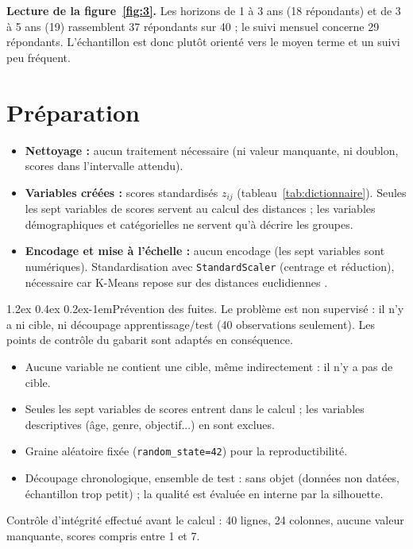 \documentclass[11pt,a4paper]{article}
\makeatletter
\renewcommand\paragraph{\@startsection{paragraph}{4}{\z@}%
  {1.2ex \@plus 0.4ex \@minus 0.2ex}{-1em}{\normalfont\normalsize\bfseries}}
\makeatother
\begin{document}
\noindent\textbf{Lecture de la figure~\ref{fig:3}.} Les horizons de 1 à 3 ans (18 répondants) et de 3 à 5 ans (19) rassemblent 37 répondants sur 40 ; le suivi mensuel concerne 29 répondants. L'échantillon est donc plutôt orienté vers le moyen terme et un suivi peu fréquent.

\section{Préparation}
\label{sec:preparation}
\begin{itemize}
  \item \textbf{Nettoyage :} aucun traitement nécessaire (ni valeur manquante, ni doublon, scores dans l'intervalle attendu).
  \item \textbf{Variables créées :} scores standardisés $z_{ij}$ (tableau~\ref{tab:dictionnaire}). Seules les sept variables de scores servent au calcul des distances ; les variables démographiques et catégorielles ne servent qu'à décrire les groupes.
  \item \textbf{Encodage et mise à l'échelle :} aucun encodage (les sept variables sont numériques). Standardisation avec \texttt{StandardScaler} (centrage et réduction), nécessaire car K-Means repose sur des distances euclidiennes \cite{sklearn}.
\end{itemize}

\paragraph{Prévention des fuites.} Le problème est non supervisé : il n'y a ni cible, ni découpage apprentissage/test (40 observations seulement). Les points de contrôle du gabarit sont adaptés en conséquence.
\begin{itemize}
  \item[$\boxtimes$] Aucune variable ne contient une cible, même indirectement : il n'y a pas de cible.
  \item[$\boxtimes$] Seules les sept variables de scores entrent dans le calcul ; les variables descriptives (âge, genre, objectif...) en sont exclues.
  \item[$\boxtimes$] Graine aléatoire fixée (\texttt{random\_state=42}) pour la reproductibilité.
  \item[$\square$] Découpage chronologique, ensemble de test : sans objet (données non datées, échantillon trop petit) ; la qualité est évaluée en interne par la silhouette.
\end{itemize}
Contrôle d'intégrité effectué avant le calcul : 40 lignes, 24 colonnes, aucune valeur manquante, scores compris entre 1 et 7.
\end{document}
